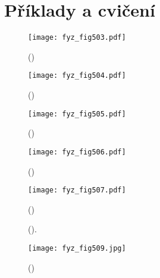   \section{Příklady a cvičení}\label{fyz:IchappXXXIVsecX}

  \begin{figure}[ht!] %
    \centering
    \texttt{[image: fyz\_fig503.pdf]}
    \caption{
             (\cite[s.~697]{Feynman01})}
    \label{fyz:fig503}
  \end{figure}

  \begin{figure}[ht!] %
    \centering
    \texttt{[image: fyz\_fig504.pdf]}
    \caption{
             (\cite[s.~697]{Feynman01})}
    \label{fyz:fig504}
  \end{figure}

  \begin{figure}[ht!] %
    \centering
    \texttt{[image: fyz\_fig505.pdf]}
    \caption{
             (\cite[s.~697]{Feynman01})}
    \label{fyz:fig505}
  \end{figure}
  
  \begin{figure}[ht!] %
    \centering
    \texttt{[image: fyz\_fig506.pdf]}
    \caption{
             (\cite[s.~697]{Feynman01})}
    \label{fyz:fig506}
  \end{figure}

  \begin{figure}[ht!] %
    \centering
    \texttt{[image: fyz\_fig507.pdf]}
    \caption{
             (\cite[s.~697]{Feynman01})}
    \label{fyz:fig507}
  \end{figure}

  \begin{figure}[hb!] %
    \centering
    \caption{
             (\cite[s.~601]{Feynman01}).}
    \label{fyz:fig508}
  \end{figure}

  \begin{figure}[ht!] %
    \centering
    \texttt{[image: fyz\_fig509.jpg]}
    \caption{
             (\cite[s.~697]{Feynman01})}
    \label{fyz:fig509}
  \end{figure}

